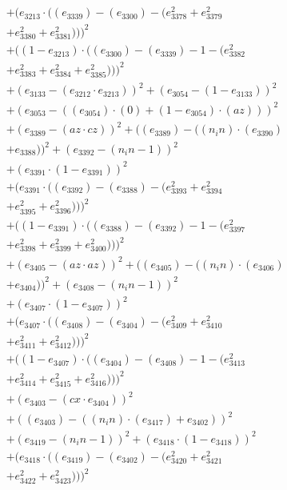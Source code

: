 \documentclass[10pt, a4paper]{article}
\begin{document}
\begin{small}
\begin{align*}
& + (e_{3213}  \cdot  ((e_{3339}) - (e_{3300}) - (e_{3378}^{2} + e_{3379}^{2} \\
& + e_{3380}^{2} + e_{3381}^{2})))^{2} \\
& + ((1 - e_{3213})  \cdot  ((e_{3300}) - (e_{3339}) - 1 - (e_{3382}^{2} \\
& + e_{3383}^{2} + e_{3384}^{2} + e_{3385}^{2})))^{2} \\
& + (e_{3133} - (e_{3212}  \cdot  e_{3213}))^{2} + (e_{3054} - (1 - e_{3133}))^{2} \\
& + (e_{3053} - ((e_{3054})  \cdot  (0) + (1 - e_{3054})  \cdot  (az)))^{2} \\
& + (e_{3389} - (az  \cdot  cz))^{2} + ((e_{3389}) - ((n_in)  \cdot  (e_{3390}) \\
& + e_{3388}))^{2} + (e_{3392} - (n_in - 1))^{2} \\
& + (e_{3391}  \cdot  (1 - e_{3391}))^{2} \\
& + (e_{3391}  \cdot  ((e_{3392}) - (e_{3388}) - (e_{3393}^{2} + e_{3394}^{2} \\
& + e_{3395}^{2} + e_{3396}^{2})))^{2} \\
& + ((1 - e_{3391})  \cdot  ((e_{3388}) - (e_{3392}) - 1 - (e_{3397}^{2} \\
& + e_{3398}^{2} + e_{3399}^{2} + e_{3400}^{2})))^{2} \\
& + (e_{3405} - (az  \cdot  az))^{2} + ((e_{3405}) - ((n_in)  \cdot  (e_{3406}) \\
& + e_{3404}))^{2} + (e_{3408} - (n_in - 1))^{2} \\
& + (e_{3407}  \cdot  (1 - e_{3407}))^{2} \\
& + (e_{3407}  \cdot  ((e_{3408}) - (e_{3404}) - (e_{3409}^{2} + e_{3410}^{2} \\
& + e_{3411}^{2} + e_{3412}^{2})))^{2} \\
& + ((1 - e_{3407})  \cdot  ((e_{3404}) - (e_{3408}) - 1 - (e_{3413}^{2} \\
& + e_{3414}^{2} + e_{3415}^{2} + e_{3416}^{2})))^{2} \\
& + (e_{3403} - (cx  \cdot  e_{3404}))^{2} \\
& + ((e_{3403}) - ((n_in)  \cdot  (e_{3417}) + e_{3402}))^{2} \\
& + (e_{3419} - (n_in - 1))^{2} + (e_{3418}  \cdot  (1 - e_{3418}))^{2} \\
& + (e_{3418}  \cdot  ((e_{3419}) - (e_{3402}) - (e_{3420}^{2} + e_{3421}^{2} \\
& + e_{3422}^{2} + e_{3423}^{2})))^{2} \\

\end{align*}
\end{small}
\end{document}
